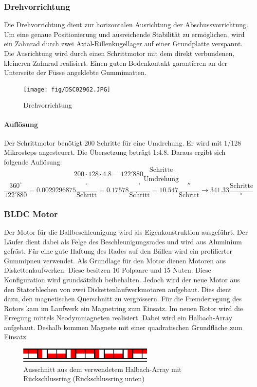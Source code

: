 \subsubsection{Drehvorrichtung}
\label{sec:drehvorrichtung}
Die Drehvorrichtung dient zur horizontalen Ausrichtung der 
Abschussvorrichtung. Um eine genaue Positionierung und ausreichende Stabilität 
zu ermöglichen, wird ein Zahnrad durch zwei Axial-Rillenkugellager auf einer 
Grundplatte verspannt. Die Ausrichtung wird durch einen Schrittmotor mit dem 
direkt verbundenen, kleineren Zahnrad realisiert. Einen guten Bodenkontakt 
garantieren an der Unterseite der Füsse angeklebte Gummimatten.

\begin{figure}[h!]
    \centering
    \texttt{[image: fig/DSC02962.JPG]}
    \caption{Drehvorrichtung}
    \label{fig:drehvorrichtung}
\end{figure}

\paragraph{Auflösung}
Der Schrittmotor benötigt 200 Schritte für eine Umdrehung. Er wird mit 1/128 
Mikrosteps angesteuert. Die Übersetzung beträgt 1:4.8. Daraus ergibt sich 
folgende Auflösung: 
\[ 200 \cdot 128 \cdot 4.8 = 122'880 \frac{\text{Schritte}}{\text{Umdrehung}}  \]
\[ \frac{360^\circ}{122'880} = 0.0029296875 \frac{^\circ}{\text{Schritt}} 
= 0.17578 \frac{'}{\text{Schritt}} = 10.547 \frac{''}{\text{Schritt}}
\rightarrow 341.33 \frac{\text{Schritte}}{^\circ}\]

\subsubsection{BLDC Motor}
\label{sec:motor}
Der Motor für die Ballbeschleunigung wird als Eigenkonstruktion ausgeführt.  
Der Läufer dient dabei als Felge des Beschleunigungsrades und wird aus 
Aluminium gefräst. Für eine gute Haftung des Rades auf den Bällen wird ein 
profilierter Gummipneu verwendet. Als Grundlage für den Motor dienen Motoren 
aus Diskettenlaufwerken. Diese besitzen 10 Polpaare und 15 Nuten. Diese 
Konfiguration wird grundsätzlich beibehalten. Jedoch wird der neue Motor aus 
den Statorblechen von zwei Diskettenlaufwerkmotoren aufgebaut. Dies dient 
dazu, den magnetischen Querschnitt zu vergrössern. Für die Fremderregung des 
Rotors kam im Laufwerk ein Magnetring zum Einsatz. Im neuen Rotor wird die 
Erregung mittels Neodymmagneten realisiert. Dabei wird ein Halbach-Array 
aufgebaut. Deshalb kommen Magnete mit einer quadratischen Grundfläche zum 
Einsatz. 
\begin{figure}[h!]
    \centering
    \includegraphics[width=0.6\textwidth]{fig/halbach.pdf}
    \caption{Ausschnitt aus dem verwendetem Halbach-Array mit Rückschlussring (Rückschlussring unten)}
    \label{fig:halbach}
\end{figure}

